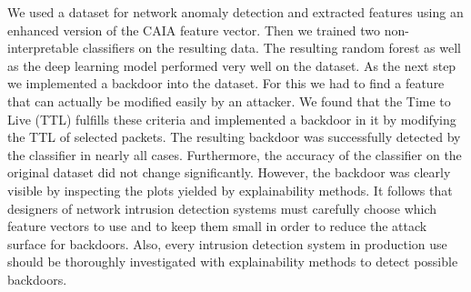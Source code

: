 \documentclass[sigconf,nonacm]{acmart}
\begin{document}
We used a dataset for network anomaly detection and extracted features using an enhanced version of the CAIA feature vector. Then we trained two non-interpretable classifiers on the resulting data. The resulting random forest as well as the deep learning model performed very well on the dataset. As the next step we implemented a backdoor into the dataset. For this we had to find a feature that can actually be modified easily by an attacker. We found that the Time to Live (TTL) fulfills these criteria and implemented a backdoor in it by modifying the TTL of selected packets. The resulting backdoor was successfully detected by the classifier in nearly all cases. Furthermore, the accuracy of the classifier on the original dataset did not change significantly. However, the backdoor was clearly visible by inspecting the plots yielded by explainability methods. It follows that designers of network intrusion detection systems must carefully choose which feature vectors to use and to keep them small in order to reduce the attack surface for backdoors. Also, every intrusion detection system in production use should be thoroughly investigated with explainability methods to detect possible backdoors. 



\end{document}
